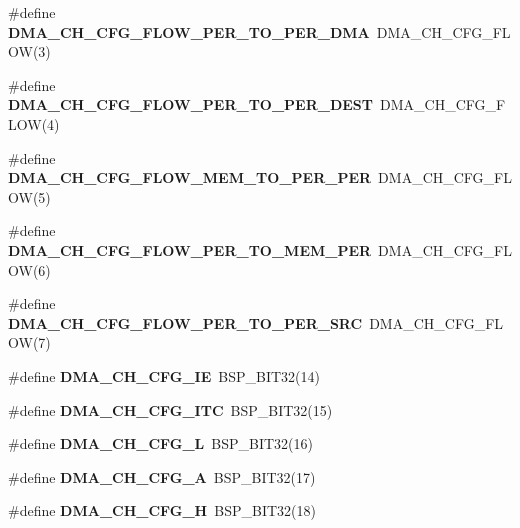 \begin{DoxyCompactItemize}
\#define {\bfseries D\+M\+A\+\_\+\+C\+H\+\_\+\+C\+F\+G\+\_\+\+F\+L\+O\+W\+\_\+\+P\+E\+R\+\_\+\+T\+O\+\_\+\+P\+E\+R\+\_\+\+D\+MA}~D\+M\+A\+\_\+\+C\+H\+\_\+\+C\+F\+G\+\_\+\+F\+L\+OW(3)
\item 
\mbox{\label{group__lpc__dma_ga9e0fde7dec89ae05609cc31032ecd5b1}} 
\#define {\bfseries D\+M\+A\+\_\+\+C\+H\+\_\+\+C\+F\+G\+\_\+\+F\+L\+O\+W\+\_\+\+P\+E\+R\+\_\+\+T\+O\+\_\+\+P\+E\+R\+\_\+\+D\+E\+ST}~D\+M\+A\+\_\+\+C\+H\+\_\+\+C\+F\+G\+\_\+\+F\+L\+OW(4)
\item 
\mbox{\label{group__lpc__dma_gac84cab64009c07c92385b33018a09cef}} 
\#define {\bfseries D\+M\+A\+\_\+\+C\+H\+\_\+\+C\+F\+G\+\_\+\+F\+L\+O\+W\+\_\+\+M\+E\+M\+\_\+\+T\+O\+\_\+\+P\+E\+R\+\_\+\+P\+ER}~D\+M\+A\+\_\+\+C\+H\+\_\+\+C\+F\+G\+\_\+\+F\+L\+OW(5)
\item 
\mbox{\label{group__lpc__dma_gaded77d06139ea85887b309cdcb9895a4}} 
\#define {\bfseries D\+M\+A\+\_\+\+C\+H\+\_\+\+C\+F\+G\+\_\+\+F\+L\+O\+W\+\_\+\+P\+E\+R\+\_\+\+T\+O\+\_\+\+M\+E\+M\+\_\+\+P\+ER}~D\+M\+A\+\_\+\+C\+H\+\_\+\+C\+F\+G\+\_\+\+F\+L\+OW(6)
\item 
\mbox{\label{group__lpc__dma_ga173b9ceb979aa6aa1fd5e312b88e1445}} 
\#define {\bfseries D\+M\+A\+\_\+\+C\+H\+\_\+\+C\+F\+G\+\_\+\+F\+L\+O\+W\+\_\+\+P\+E\+R\+\_\+\+T\+O\+\_\+\+P\+E\+R\+\_\+\+S\+RC}~D\+M\+A\+\_\+\+C\+H\+\_\+\+C\+F\+G\+\_\+\+F\+L\+OW(7)
\item 
\mbox{\label{group__lpc__dma_gaad7bee11d98d7bbd31ee52f8a9c580d8}} 
\#define {\bfseries D\+M\+A\+\_\+\+C\+H\+\_\+\+C\+F\+G\+\_\+\+IE}~B\+S\+P\+\_\+\+B\+I\+T32(14)
\item 
\mbox{\label{group__lpc__dma_gad0443fda163f81bc0b38460b66471e91}} 
\#define {\bfseries D\+M\+A\+\_\+\+C\+H\+\_\+\+C\+F\+G\+\_\+\+I\+TC}~B\+S\+P\+\_\+\+B\+I\+T32(15)
\item 
\mbox{\label{group__lpc__dma_gab5178245ec64c761e9b473b8d5916ada}} 
\#define {\bfseries D\+M\+A\+\_\+\+C\+H\+\_\+\+C\+F\+G\+\_\+L}~B\+S\+P\+\_\+\+B\+I\+T32(16)
\item 
\mbox{\label{group__lpc__dma_ga27ad1ee18bd8b4b51b4a34779885f1e8}} 
\#define {\bfseries D\+M\+A\+\_\+\+C\+H\+\_\+\+C\+F\+G\+\_\+A}~B\+S\+P\+\_\+\+B\+I\+T32(17)
\item 
\mbox{\label{group__lpc__dma_gab6bd00901d95491dbd348ed2cf199876}} 
\#define {\bfseries D\+M\+A\+\_\+\+C\+H\+\_\+\+C\+F\+G\+\_\+H}~B\+S\+P\+\_\+\+B\+I\+T32(18)
\end{DoxyCompactItemize}
